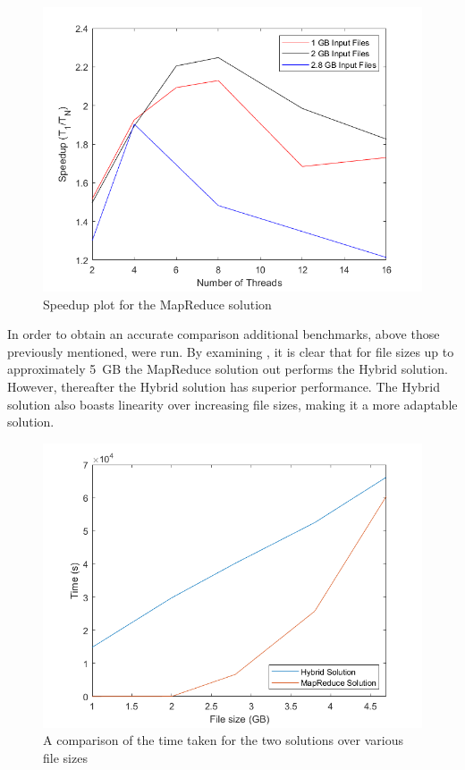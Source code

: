 \documentclass[12pt,twocolumn]{witseiepaper}
\begin{document}
\begin{figure}[h]
	\centering
	\includegraphics[width=1\columnwidth]{mapReduceSpeedup.png}
	\caption{Speedup plot for the MapReduce solution}
	\raggedright
	\label{fig:speedUpMR}	
\end{figure}

In order to obtain an accurate comparison additional benchmarks, above those previously mentioned, were run. By examining , it is clear that for file sizes up to approximately 5~GB the MapReduce solution out performs the Hybrid solution. However, thereafter the Hybrid solution has superior performance. The Hybrid solution also boasts linearity over increasing file sizes, making it a more adaptable solution.

\begin{figure}[h]
	\centering
	\includegraphics[width=1\columnwidth]{comparison.png}
	\caption{A comparison of the time taken for the two solutions over various file sizes}
	\raggedright
	\label{fig:comparison}	
\end{figure}
\end{document}
